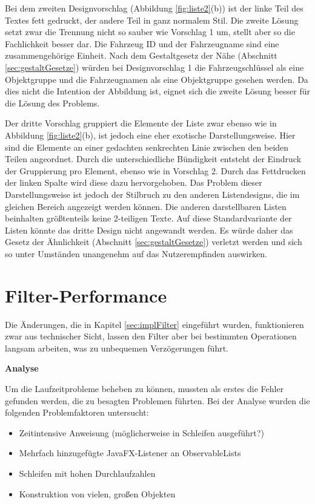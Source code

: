 Bei dem zweiten Designvorschlag (Abbildung \ref{fig:liste2}(b)) ist der linke Teil des Textes fett gedruckt, der andere Teil in ganz normalem Stil. Die zweite Lösung setzt zwar die Trennung nicht so sauber wie Vorschlag 1 um, stellt aber so die Fachlichkeit besser dar. Die Fahrzeug ID und der Fahrzeugname sind eine zusammengehörige Einheit. Nach dem Gestaltgesetz der Nähe (Abschnitt \ref{sec:gestaltGesetze}) würden bei Designvorschlag 1 die Fahrzeugschlüssel als eine Objektgruppe und die Fahrzeugnamen als eine Objektgruppe gesehen werden. Da dies nicht die Intention der Abbildung ist, eignet sich die zweite Lösung besser für die Lösung des Problems.

Der dritte Vorschlag gruppiert die Elemente der Liste zwar ebenso wie in Abbildung \ref{fig:liste2}(b), ist jedoch eine eher exotische Darstellungsweise. Hier sind die Elemente an einer gedachten senkrechten Linie zwischen den beiden Teilen angeordnet. Durch die unterschiedliche Bündigkeit entsteht der Eindruck der Gruppierung pro Element, ebenso wie in Vorschlag 2. Durch das Fettdrucken der linken Spalte wird diese dazu hervorgehoben. Das Problem dieser Darstellungsweise ist jedoch der Stilbruch zu den anderen Listendesigns, die im gleichen Bereich angezeigt werden können. Die anderen darstellbaren Listen beinhalten größtenteils keine 2-teiligen Texte. Auf diese Standardvariante der Listen könnte das dritte Design nicht angewandt werden. Es würde daher das Gesetz der Ähnlichkeit (Abschnitt \ref{sec:gestaltGesetze}) verletzt werden und sich so unter Umständen unangenehm auf das Nutzerempfinden auswirken.
\section{Filter-Performance} \label{sec:analyseFilterPerformance}
Die Änderungen, die in Kapitel \ref{sec:implFilter} eingeführt wurden, funktionieren zwar aus technischer Sicht, lassen den Filter aber bei bestimmten Operationen langsam arbeiten, was zu unbequemen Verzögerungen führt.

\textbf{Analyse}

Um die Laufzeitprobleme beheben zu können, mussten als erstes die Fehler gefunden werden, die zu besagten Problemen führten. Bei der Analyse wurden die folgenden Problemfaktoren untersucht:

\begin{itemize}
	\item Zeitintensive Anweisung (möglicherweise in Schleifen ausgeführt?)
	\item Mehrfach hinzugefügte JavaFX-Listener an ObservableLists
	\item Schleifen mit hohen Durchlaufzahlen
	\item Konstruktion von vielen, großen Objekten
\end{itemize}

